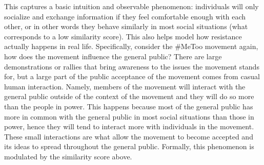 \documentclass[12pt]{article}
\begin{document}
This captures a basic intuition and observable phenomenon: individuals will only socialize
and exchange information if they feel comfortable enough with each other, or in other words
they behave similarly in most social situations (what corresponds to a low similarity score).
This also helps model how resistance actually happens in real life. Specifically, consider the \#MeToo movement
again, how does the movement influence the general public? There are large demonstrations or rallies that bring
awareness to the issues the movement stands for, but a large part of the public acceptance of the movement comes from
casual human interaction. Namely, members of the movement will interact with the general public outside of the context of the movement
and they will do so more than the people in power. This happens because most of the general public has more in common with the general public
in most social situations than those in power, hence they will tend to interact more with individuals in the movement. These small interactions
are what allow the movement to become accepted and its ideas to spread throughout the general public. Formally,
this phenomenon is modulated by the similarity score above.
\end{document}
